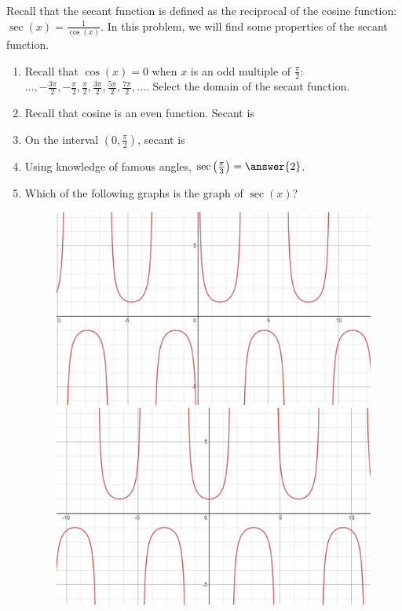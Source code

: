 \documentclass{ximera}
\author{Kenneth Berglund}
\begin{document}
Recall that the secant function is defined as the reciprocal of the cosine function: $\sec(x) = \frac{1}{\cos(x)}$. In this problem, we will find some properties of the secant function. 
\begin{exercise}
\begin{enumerate}
\item Recall that $\cos(x) = 0$ when $x$ is an odd multiple of $\frac{\pi}{2}$: $\ldots, -\frac{3\pi}{2}, -\frac{\pi}{2}, \frac{\pi}{2}, \frac{3\pi}{2}, \frac{5\pi}{2}, \frac{7\pi}{2}, \ldots$. Select the domain of the secant function.
\begin{multipleChoice}
\choice{$(- \infty, \infty)$}
\end{multipleChoice}


\item Recall that cosine is an even function. Secant is 
\begin{multipleChoice}
\end{multipleChoice}


\item On the interval $\left(0, \frac{\pi}{2}\right)$, secant is 
\begin{multipleChoice}
\end{multipleChoice}

\item Using knowledge of famous angles, $\sec\left(\frac{\pi}{3}\right) = \answer{2}$.

\item Which of the following graphs is the graph of $\sec(x)$?
\begin{figure}[!h]
\begin{image}
\includegraphics[width=.4\linewidth]{ex8-a.png}
\hspace{20mm}
\includegraphics[width=.4\linewidth]{ex8-b.png}


\end{image}
\end{figure}
\end{enumerate}
\end{exercise}
\end{document}
